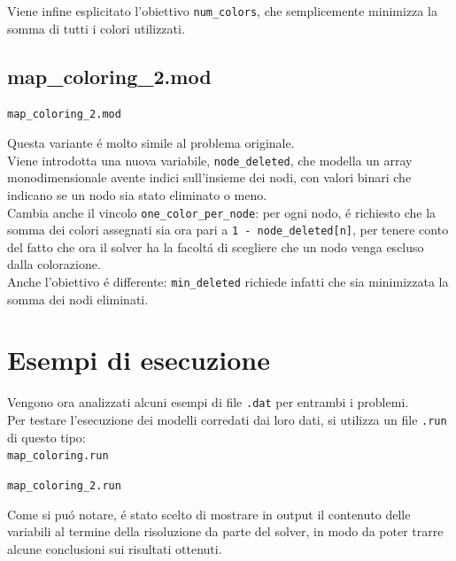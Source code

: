 \documentclass{article}
\begin{document}
Viene infine esplicitato l'obiettivo \texttt{num\_colors}, che semplicemente minimizza la somma di tutti i colori utilizzati.\\
\pagebreak

\subsection{map\_coloring\_2.mod}
\texttt{map\_coloring\_2.mod}


\vspace{5mm}

Questa variante \'e molto simile al problema originale.\\
Viene introdotta una nuova variabile, \texttt{node\_deleted}, che modella un array monodimensionale avente indici sull'insieme dei nodi, con valori binari che indicano se un nodo sia stato eliminato o meno.\\

Cambia anche il vincolo \texttt{one\_color\_per\_node}: per ogni nodo, \'e richiesto che la somma dei colori assegnati sia ora pari a \texttt{1 - node\_deleted[n]}, per tenere conto del fatto che ora il solver ha la facolt\'a di scegliere che un nodo venga escluso dalla colorazione.\\

Anche l'obiettivo \'e differente: \texttt{min\_deleted} richiede infatti che sia minimizzata la somma dei nodi eliminati.\\
\pagebreak

\section{Esempi di esecuzione}
Vengono ora analizzati alcuni esempi di file \texttt{.dat} per entrambi i problemi.\\
Per testare l'esecuzione dei modelli corredati dai loro dati, si utilizza un file \texttt{.run} di questo tipo:\\

\texttt{map\_coloring.run}


\vspace{5mm}

\texttt{map\_coloring\_2.run}


\vspace{5mm}

Come si pu\'o notare, \'e stato scelto di mostrare in output il contenuto delle variabili al termine della risoluzione da parte del solver, in modo da poter trarre alcune conclusioni sui risultati ottenuti.\\
\end{document}
